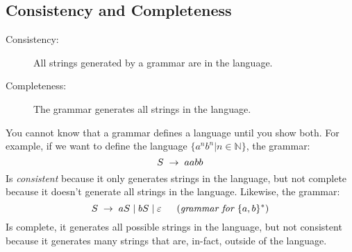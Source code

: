 \subsection{Consistency and Completeness}
\begin{description}
    \item[{\small Consistency:}] All strings generated by a grammar are 
    in the language.
    \item[{\small Completeness:}] The grammar generates all strings 
    in the language.
\end{description}

You cannot know that a grammar defines a language until you show both.
For example, if we want to define the language $\{a^nb^n | n \in \mathbb{N}\}$,
the grammar:
\[
    S \;\to\; aabb
\]
Is \textit{consistent} because it only generates strings in the language,
but not complete because it doesn't generate all strings in the language.
Likewise, the grammar:
\[
    S \;\to\; aS \;|\; bS \;|\; \varepsilon 
    \;\;\quad (\textit{grammar for }\{a, b\}^*)
\]
Is complete, it generates all possible strings in the language, but not
consistent because it generates many strings that are, in-fact, outside of
the language.
